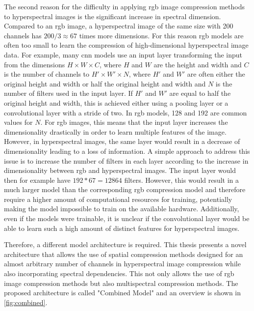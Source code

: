 The second reason for the difficulty in applying \ac{rgb} image compression methods to hyperspectral images is the significant increase in spectral dimension. Compared to an \ac{rgb} image, a hyperspectral image of the same size with 200 channels has $200/3 \approx 67$ times more dimensions. For this reason \ac{rgb} models are often too small to learn the compression of high-dimensional hyperspectral image data. For example, many \ac{cnn} models use an input layer transforming the input from the dimensions $H \times W \times C$, where $H$ and $W$ are the height and width and $C$ is the number of channels to $H' \times W' \times N$, where $H'$ and $W'$ are often either the original height and width or half the original height and width and $N$ is the number of filters used in the input layer. If $H'$ and $W'$ are equal to half the original height and width, this is achieved either using a pooling layer or a convolutional layer with a stride of two. In \ac{rgb} models, 128 and 192 are common values for $N$. For \ac{rgb} images, this means that the input layer increases the dimensionality drastically in order to learn multiple features of the image. However, in hyperspectral images, the same layer would result in a decrease of dimensionality leading to a loss of information. A simple approach to address this issue is to increase the number of filters in each layer according to the increase in dimensionality between \ac{rgb} and hyperspectral images. The input layer would then for example have $192 * 67 = 12864$ filters. However, this would result in a much larger model than the corresponding \ac{rgb} compression model and therefore require a higher amount of computational resources for training, potentially making the model impossible to train on the available hardware. Additionally, even if the models were trainable, it is unclear if the convolutional layer would be able to learn such a high amount of distinct features for hyperspectral images.

Therefore, a different model architecture is required. This thesis presents a novel architecture that allows the use of spatial compression methods designed for an almost arbitrary number of channels in hyperspectral image compression while also incorporating spectral dependencies. This not only allows the use of \ac{rgb} image compression methods but also multispectral compression methods. The proposed architecture is called "Combined Model" and an overview is shown in \autoref{fig:combined}.
